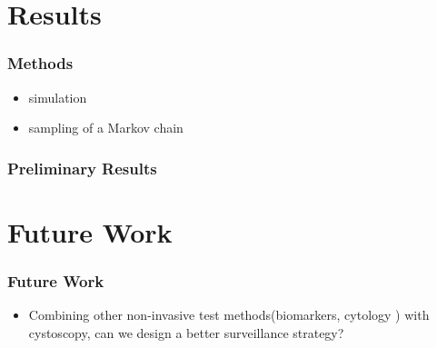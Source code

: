 \documentclass{beamer}
\begin{document}
\section{Results}
\frame
{
  \frametitle{Methods }

  \begin{itemize}

  \item {simulation}
  \item {sampling of a Markov chain}
  \end{itemize}
 
}
\frame
{
  \frametitle{Preliminary Results }

  
 
}

\section{Future Work}
\frame
{
  \frametitle{Future Work }
  \begin{itemize}

\item<1-> {Combining other non-invasive test methods(biomarkers, cytology ) with cystoscopy, can we design a better surveillance strategy?} 


\end{itemize}

 
}
\end{document}
